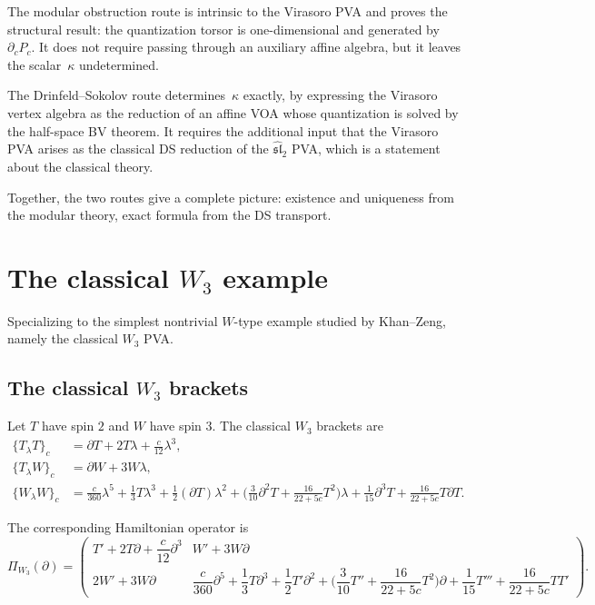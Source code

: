 \begin{remark}
\label{rem:virasoro-two-routes}
The modular obstruction route is intrinsic to the Virasoro PVA and proves
the structural result: the quantization torsor is one-dimensional and
generated by $\partial_c P_c$. It does not require passing through an
auxiliary affine algebra, but it leaves the scalar~$\kappa$ undetermined.

The Drinfeld--Sokolov route determines~$\kappa$ exactly, by expressing
the Virasoro vertex algebra as the reduction of an affine VOA whose
quantization is solved by the half-space BV theorem. It requires the
additional input that the Virasoro PVA arises as the classical DS
reduction of the $\widehat{\mathfrak{sl}}_2$ PVA, which is a statement
about the classical theory.

Together, the two routes give a complete picture: existence and uniqueness
from the modular theory, exact formula from the DS transport.
\end{remark}

\section{The classical $W_3$ example}

Specializing to the simplest nontrivial $W$-type example studied by Khan--Zeng,
namely the classical $W_3$ PVA.

\subsection{The classical $W_3$ brackets}

Let $T$ have spin $2$ and $W$ have spin $3$. The classical $W_3$ brackets are
\cite{KZ25}
\begin{align}
\{T_\lambda T\}_c
&=
\partial T+2T\lambda+\frac{c}{12}\lambda^3,
\\[4pt]
\{T_\lambda W\}_c
&=
\partial W+3W\lambda,
\\[4pt]
\{W_\lambda W\}_c
&=
\frac{c}{360}\lambda^5
+\frac13 T\lambda^3
+\frac12(\partial T)\lambda^2
+\Big(\frac3{10}\partial^2T+\frac{16}{22+5c}T^2\Big)\lambda
+\frac1{15}\partial^3T
+\frac{16}{22+5c}T\partial T.
\end{align}

The corresponding Hamiltonian operator is
\[
\Pi_{W_3}(\partial)=
\begin{pmatrix}
T'+2T\partial+\dfrac c{12}\partial^3
&
W'+3W\partial
\\[2mm]
2W'+3W\partial
&
\dfrac c{360}\partial^5
+\dfrac13 T\partial^3
+\dfrac12 T'\partial^2
+\Big(\dfrac{3}{10}T''+\dfrac{16}{22+5c}T^2\Big)\partial
+\dfrac1{15}T'''
+\dfrac{16}{22+5c}TT'
\end{pmatrix}.
\]

